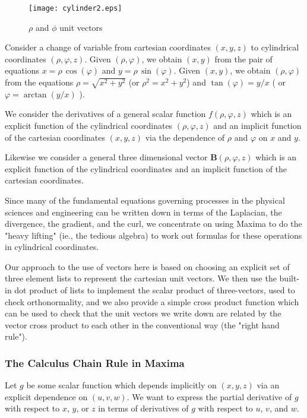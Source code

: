 \documentclass[12pt]{article}
\begin{document}
\begin{figure} [h]
   \centerline{\texttt{[image: cylinder2.eps]} }
	\caption{ $\rho$ and $\phi$ unit vectors   }
\end{figure}   

\smallskip
  
Consider a change of variable
  from cartesian coordinates $(x,y,z)$ to cylindrical
  coordinates $(\rho,\varphi, z)$.  
Given $(\rho,\varphi)$, we obtain $(x,y)$ from the pair of equations
  $x = \rho \,\cos(\varphi)$ and $y = \rho \,\sin(\varphi)$.
Given $(x,y)$, we obtain $(\rho,\varphi)$ from the equations
  $\rho = \sqrt{x^2 + y^2}$ (or $\rho^2 = x^2 + y^2$) and
  $\tan(\varphi) = y/x$ ( or $\varphi = \arctan(y/x)$ ).

\smallskip
  
We consider the derivatives of a general scalar function $f(\rho,\varphi,z)$ which
  is an explicit function of the cylindrical coordinates $(\rho, \varphi, z)$
  and an implicit function of the cartesian coordinates $(x,y,z)$ via the dependence of
  $\rho$ and $\varphi$ on $x$ and $y$.

  \smallskip
Likewise we consider a general three dimensional vector $\mathbf{B}(\rho,\varphi,z)$
 which is an explicit function of the cylindrical coordinates and an implicit function
  of the cartesian coordinates.
  
Since many of the fundamental equations governing processes in the physical 
  sciences and engineering can be written down in terms of the Laplacian, the
  divergence, the gradient, and the curl, we concentrate on using Maxima
  to do the "heavy lifting" (ie., the tedious algebra) to work out
  formulas for these operations in cylindrical coordinates.

Our approach to the use of vectors here is based on choosing an explicit
  set of three element lists to represent the cartesian unit vectors.
We then use the built-in dot product of lists to implement the scalar
  product of three-vectors, used to check orthonormality, and we also provide
  a simple cross product function which can be used to check that the unit
  vectors we write down are related by the vector cross product to each other
  in the conventional way (the "right hand rule").
  
\subsubsection{The Calculus Chain Rule in Maxima}
Let $g$ be some scalar function which depends implicitly on $(x,y,z)$
  via an explicit dependence on $(u,v,w)$.
We want to express the partial derivative of $g$ with respect
  to $x$, $y$, or $z$ in terms of derivatives of $g$ with
  respect to $u$, $v$, and $w$.
\end{document}
